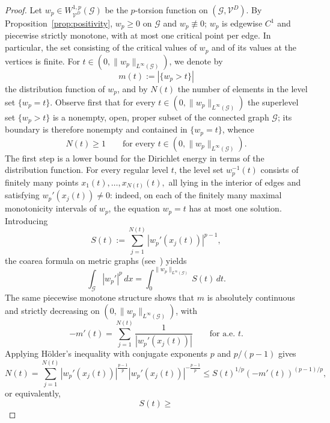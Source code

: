 \documentclass[12pt,a4paper]{article}
\numberwithin{equation}{section}
\newcommand{\WpD}{W^{1,p}_{\mathcal{V}^D}(\mathcal G)}
\begin{document}
\begin{proof}
	Let $w_p\in\WpD$ be the $p$-torsion function on
	$(\mathcal G,\mathcal{V}^D)$. By Proposition~\ref{prop:positivity},
	$w_p\ge0$ on $\mathcal G$ and $w_p\not\equiv0$; $w_p$ is edgewise $C^1$ and piecewise
	strictly monotone, with at most one critical point per edge. In
	particular, the set consisting of the critical values of $w_p$ and of
	its values at the vertices is finite. 
 For  $t\in(0,\|w_p\|_{L^{\infty}(\mathcal{G})})$,	we denote by
	\[
	m(t):=|\{w_p>t\}|
	\]
	the distribution function of $w_p$, and by $N(t)$ the number of elements
	in the level set $\{w_p=t\}$. Observe first that for every
	$t\in(0,\|w_p\|_{L^{\infty}(\mathcal{G})})$ the superlevel set $\{w_p>t\}$ is a nonempty,
	open, proper subset of the connected graph $\mathcal G$; its boundary is
	therefore nonempty and contained in $\{w_p=t\}$, whence
	\begin{equation}
		\label{eq:Nge1}
		N(t)\ge1
		\qquad
		\text{for every }t\in(0,\|w_p\|_{L^{\infty}(\mathcal{G})}).
	\end{equation}
	The first step is a lower bound for the Dirichlet energy in terms of
	the distribution function. For every regular level $t$, the level set
	$w_p^{-1}(t)$ consists of finitely many points
	\(
	x_1(t),\ldots,x_{N(t)}(t),
	\)
	all lying in the interior of edges and satisfying
	$w_p'(x_j(t))\neq0$: indeed, on each of the finitely many maximal
	monotonicity intervals of $w_p$, the equation $w_p=t$ has at most one
	solution. Introducing
	\[
	S(t):=
	\sum_{j=1}^{N(t)}
	|w_p'(x_j(t))|^{p-1},
	\]
	the coarea formula on metric graphs  (see~\cite[p.~22]{AST17})
	yields
	\begin{equation}
		\label{eq:coarea_Lp}
		\int_{\mathcal G}|w_p'|^p\,dx
		=
		\int_0^{\|w_p\|_{L^{\infty}(\mathcal{G})}}
		S(t)\,dt.
	\end{equation}
	The same piecewise monotone structure shows that $m$ is absolutely
	continuous and strictly decreasing on $(0,\|w_p\|_{L^{\infty}(\mathcal{G})})$, with
	\begin{equation}
		\label{eq:mdiff}
		-m'(t)
		=
		\sum_{j=1}^{N(t)}
		\frac1{|w_p'(x_j(t))|}
		\qquad
		\text{for a.e. }t.
	\end{equation}
	Applying H\"older's inequality with conjugate exponents
	$p$ and $p/(p-1)$ gives
	\[
	N(t)
	=
	\sum_{j=1}^{N(t)}
	|w_p'(x_j(t))|^{\frac{p-1}{p}}
	|w_p'(x_j(t))|^{-\frac{p-1}{p}}
	\le
	S(t)^{1/p}
	(-m'(t))^{(p-1)/p},
	\]
	or equivalently,
	\begin{equation}
		\label{eq:Holder_level}
		S(t)
		\ge

\end{equation}
\end{proof}
\end{document}
